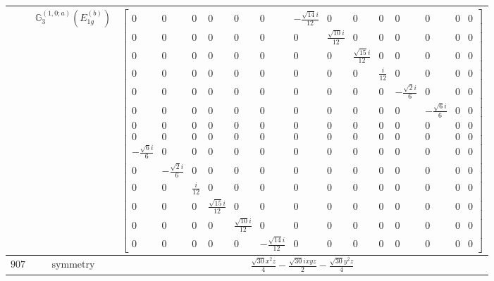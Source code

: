 \documentclass[fleqn,8pt,landscape]{jsarticle}
\begin{document}
\begin{longtable}{ccc}
$  $ & $ \mathbb{G}_{3}^{(1,0;a)}(E_{1g}^{(b)}) $ & $ \begin{bmatrix} 0 & 0 & 0 & 0 & 0 & 0 & - \frac{\sqrt{14} i}{12} & 0 & 0 & 0 & 0 & 0 & 0 & 0 \\ 0 & 0 & 0 & 0 & 0 & 0 & 0 & \frac{\sqrt{10} i}{12} & 0 & 0 & 0 & 0 & 0 & 0 \\ 0 & 0 & 0 & 0 & 0 & 0 & 0 & 0 & \frac{\sqrt{15} i}{12} & 0 & 0 & 0 & 0 & 0 \\ 0 & 0 & 0 & 0 & 0 & 0 & 0 & 0 & 0 & \frac{i}{12} & 0 & 0 & 0 & 0 \\ 0 & 0 & 0 & 0 & 0 & 0 & 0 & 0 & 0 & 0 & - \frac{\sqrt{2} i}{6} & 0 & 0 & 0 \\ 0 & 0 & 0 & 0 & 0 & 0 & 0 & 0 & 0 & 0 & 0 & - \frac{\sqrt{6} i}{6} & 0 & 0 \\ 0 & 0 & 0 & 0 & 0 & 0 & 0 & 0 & 0 & 0 & 0 & 0 & 0 & 0 \\ 0 & 0 & 0 & 0 & 0 & 0 & 0 & 0 & 0 & 0 & 0 & 0 & 0 & 0 \\ - \frac{\sqrt{6} i}{6} & 0 & 0 & 0 & 0 & 0 & 0 & 0 & 0 & 0 & 0 & 0 & 0 & 0 \\ 0 & - \frac{\sqrt{2} i}{6} & 0 & 0 & 0 & 0 & 0 & 0 & 0 & 0 & 0 & 0 & 0 & 0 \\ 0 & 0 & \frac{i}{12} & 0 & 0 & 0 & 0 & 0 & 0 & 0 & 0 & 0 & 0 & 0 \\ 0 & 0 & 0 & \frac{\sqrt{15} i}{12} & 0 & 0 & 0 & 0 & 0 & 0 & 0 & 0 & 0 & 0 \\ 0 & 0 & 0 & 0 & \frac{\sqrt{10} i}{12} & 0 & 0 & 0 & 0 & 0 & 0 & 0 & 0 & 0 \\ 0 & 0 & 0 & 0 & 0 & - \frac{\sqrt{14} i}{12} & 0 & 0 & 0 & 0 & 0 & 0 & 0 & 0 \end{bmatrix} $ \\ \hline
$ 907 $ & $ \text{symmetry} $ & $ \frac{\sqrt{30} x^{2} z}{4} - \frac{\sqrt{30} i x y z}{2} - \frac{\sqrt{30} y^{2} z}{4} $ \\

\end{longtable}
\end{document}

